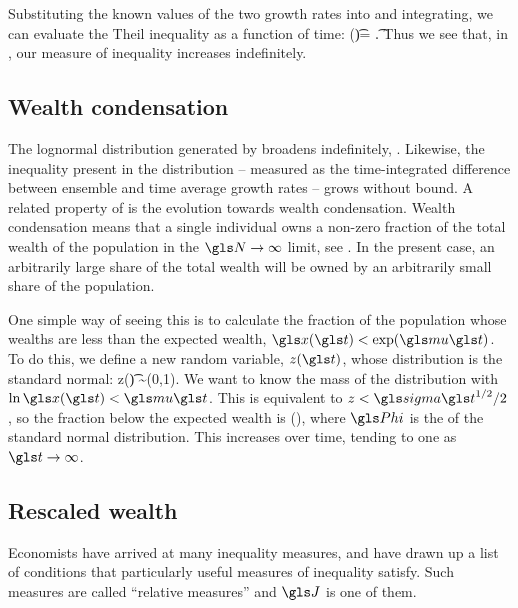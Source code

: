 Substituting the known values of the two growth rates into  and integrating, we can evaluate the Theil inequality as a function of time:
\be
\J(\t)= \t.
\ee
Thus we see that, in \GBM, our measure of inequality increases indefinitely.


\subsection{Wealth condensation}
The lognormal distribution generated by \GBM broadens indefinitely, . Likewise, the inequality present in the distribution -- measured as the time-integrated difference between ensemble and time average growth rates -- grows without bound. A related property of \GBM is the evolution towards wealth condensation. Wealth condensation means that a single individual owns a non-zero fraction of the total wealth of the population in the $\N\to\infty$ limit, see \eg \cite{BouchaudMezard2000}. In the present case, an arbitrarily large share of the  total wealth will be owned by an arbitrarily small share of the population.

One simple way of seeing this is to calculate the fraction of the population whose wealths are less than the expected wealth, \ie $\x(\t)<\exp(\gmu \t)$. To do this, we define a new random variable, $z(\t)$, whose distribution is the standard normal:
\be
z(\t) \equiv {} \sim \mathcal{\N}(0,1).
\ee
We want to know the mass of the distribution with $\ln \x(\t)<\gmu \t$. This is equivalent to $z<\gsigma \t^{1/2}/2$, so the fraction below the expected wealth is
\be
\gPhi\left(\right),
\ee
where $\gPhi$ is the \CDF of the standard normal distribution. This increases over time, tending to one as $\t\to\infty$.


\subsection{Rescaled wealth}
Economists have arrived at many inequality measures, and have drawn up a list of conditions that particularly useful measures of inequality satisfy. Such measures are called ``relative measures'' \cite[Appendix 4]{Sen1997} and $\J$ is one of them.

